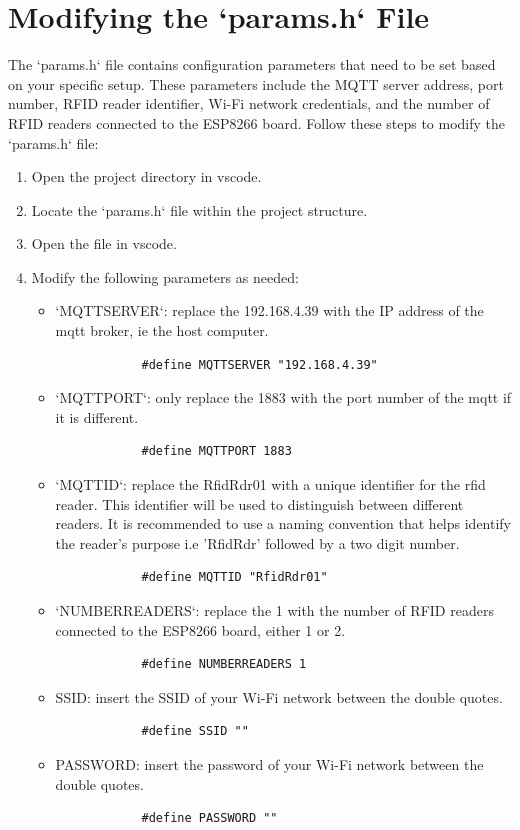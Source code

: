 \section{Modifying the `params.h` File}
The `params.h` file contains configuration parameters that need to be set based on your specific setup. These parameters include the MQTT server address, port number, RFID reader identifier, 
Wi-Fi network credentials, and the number of RFID readers connected to the ESP8266 board. Follow these steps to modify the `params.h` file:
\begin{enumerate}
    \item Open the project directory in \gls{vscode}.
    \item Locate the `params.h` file within the project structure.
    \item Open the file in \gls{vscode}.
    \item Modify the following parameters as needed:
    \begin{itemize}
        \item `MQTTSERVER`: replace the 192.168.4.39 with the IP address of the \gls{mqtt} broker, ie the host computer.
        \begin{verbatim}
            #define MQTTSERVER "192.168.4.39"
        \end{verbatim}
        \item `MQTTPORT`: only replace the 1883 with the port number of the \gls{mqtt} if it is different.
        \begin{verbatim}
            #define MQTTPORT 1883
        \end{verbatim}
        \item `MQTTID`: replace the RfidRdr01 with a unique identifier for the \gls{rfid} reader. This identifier will be used to distinguish between different readers. It is recommended to use a naming convention 
        that helps identify the reader's purpose i.e 'RfidRdr' followed by a two digit number.
        \begin{verbatim}
            #define MQTTID "RfidRdr01" 
        \end{verbatim}
        \item `NUMBERREADERS`: replace the 1 with the number of RFID readers connected to the ESP8266 board, either 1 or 2.
        \begin{verbatim}
            #define NUMBERREADERS 1
        \end{verbatim}
        \item SSID: insert the SSID of your Wi-Fi network between the double quotes.
        \begin{verbatim}
            #define SSID ""
        \end{verbatim}
        \item PASSWORD: insert the password of your Wi-Fi network between the double quotes.
        \begin{verbatim}
            #define PASSWORD ""
        \end{verbatim}
    \end{itemize}
\end{enumerate}
